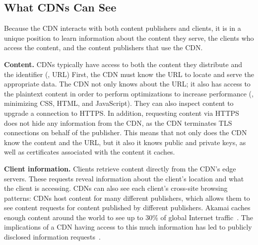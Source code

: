 
\subsection{What CDNs Can See}
\label{sec:info}

Because the CDN interacts with both content publishers and clients, it is in a unique position to learn information about the content they serve, the clients who access the content, and the content publishers that use the CDN.

\textbf{Content.}  CDNs typically have access to both the content they distribute and the identifier (\ie, URL) First, the CDN must know the URL to locate and serve the appropriate data. The CDN not only knows about the URL; it also 
has access to the plaintext content in order to perform optimizations to increase performance (\eg, minimizing CSS, HTML, and JavaScript).  
They can also inspect content to upgrade a connection to HTTPS.%
In addition, requesting content via HTTPS does not hide any information from the CDN, as the CDN terminates TLS connections on behalf of the publisher.  This means that not only does the CDN know the content and the URL, but it also it knows public and private keys, as well as certificates associated with the content it caches.  

\textbf{Client information.} Clients retrieve content directly from the
CDN's edge servers. These requests reveal information about the client's location and what the client is accessing. CDNs can also see each client's cross-site browsing patterns: CDNs host content for many different publishers, which allows them to see content requests for content published by different publishers.  Akamai caches enough content around the world to see up to 30\% of global Internet 
traffic~\cite{akamai_global_traffic}. The implications of a CDN having access to
this much information has led to publicly disclosed information requests~\cite{cloudflare_nsl}.

